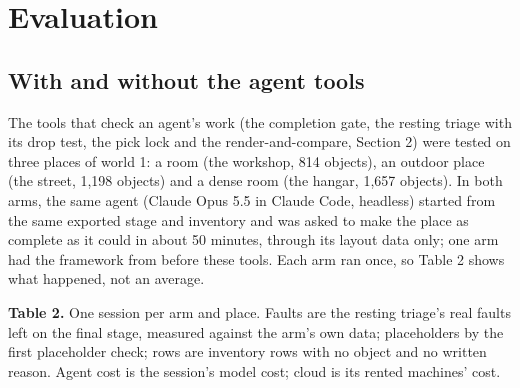 \section{Evaluation}\label{evaluation}

\begin{center}\end{center}

\subsection{With and without the agent tools}\label{with-and-without-the-agent-tools}

The tools that check an agent's work (the completion gate, the resting triage with its drop test, the pick lock and the render-and-compare, Section 2) were tested on three places of world 1: a room (the workshop, 814 objects), an outdoor place (the street, 1,198 objects) and a dense room (the hangar, 1,657 objects). In both arms, the same agent (Claude Opus 5.5 in Claude Code, headless) started from the same exported stage and inventory and was asked to make the place as complete as it could in about 50 minutes, through its layout data only; one arm had the framework from before these tools. Each arm ran once, so Table 2 shows what happened, not an average.

\textbf{Table 2.} One session per arm and place. Faults are the resting triage's real faults left on the final stage, measured against the arm's own data; placeholders by the first placeholder check; rows are inventory rows with no object and no written reason. Agent cost is the session's model cost; cloud is its rented machines' cost.

